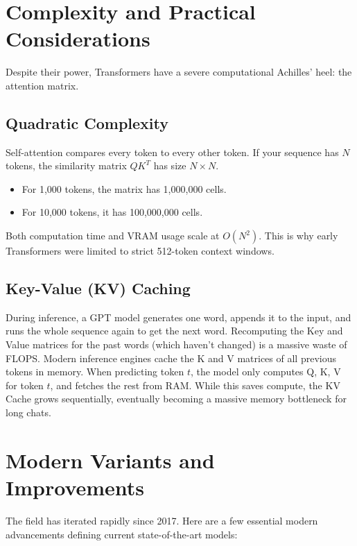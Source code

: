 \documentclass[11pt, a4paper]{article}
\begin{document}
\section{Complexity and Practical Considerations}

Despite their power, Transformers have a severe computational Achilles' heel: the attention matrix.

\subsection{Quadratic Complexity}
Self-attention compares every token to every other token. If your sequence has $N$ tokens, the similarity matrix $QK^T$ has size $N \times N$. 
\begin{itemize}
    \item For 1,000 tokens, the matrix has 1,000,000 cells.
    \item For 10,000 tokens, it has 100,000,000 cells.
\end{itemize}
Both computation time and VRAM usage scale at $O(N^2)$. This is why early Transformers were limited to strict 512-token context windows. 

\subsection{Key-Value (KV) Caching}
During inference, a GPT model generates one word, appends it to the input, and runs the whole sequence again to get the next word. Recomputing the Key and Value matrices for the past words (which haven't changed) is a massive waste of FLOPS. 
Modern inference engines cache the K and V matrices of all previous tokens in memory. When predicting token $t$, the model only computes Q, K, V for token $t$, and fetches the rest from RAM. While this saves compute, the KV Cache grows sequentially, eventually becoming a massive memory bottleneck for long chats.

\section{Modern Variants and Improvements}

The field has iterated rapidly since 2017. Here are a few essential modern advancements defining current state-of-the-art models:
\end{document}
